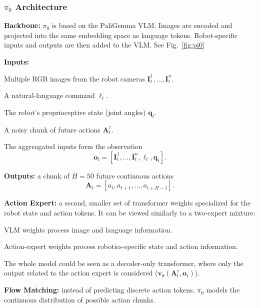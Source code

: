 \subsubsection{\texorpdfstring{$\pi_0$}{pi\_0} Architecture}

\begin{dashlist}

\item \textbf{Backbone:} $\pi_0$ is based on the PaliGemma VLM. Images are encoded and projected into the same embedding space as language tokens. Robot-specific inputs and outputs are then added to the VLM. See Fig.~\ref{fig:pi0}

\item \textbf{Inputs:}
\begin{dashlist}
    \item Multiple RGB images from the robot cameras $\mathbf{I}_t^1, \dots, \mathbf{I}_t^n$.
    \item A natural-language command $\ell_t$.
    \item The robot's proprioceptive state (joint angles) $\mathbf{q}_t$.
    \item A noisy chunk of future actions $\mathbf{A}_t^\tau$.
\end{dashlist}
The aggreagated inputs form the observation
\[
\mathbf{o}_t = [\mathbf{I}_t^1, \dots, \mathbf{I}_t^n, \ell_t, \mathbf{q}_t].
\]


\item \textbf{Outputs:} a chunk of $H=50$ future continuous actions
\[
    \mathbf{A}_t = [a_t,a_{t+1},\ldots,a_{t+H-1}].
\]

\item \textbf{Action Expert:} a second, smaller set of transformer weights specialized for the robot state and action tokens. It can be viewed similarly to a two-expert mixture:
\begin{dashlist}
    \item VLM weights process image and language information.
    \item Action-expert weights process robotics-specific state and action information.
\end{dashlist}
The whole model could be seen as a decoder-only transformer, where only the output related to the action expert is considered ($\mathbf{v}_\theta(\mathbf{A}_t^\tau,\mathbf{o}_t)$).

\item \textbf{Flow Matching:} instead of predicting discrete action tokens, $\pi_0$ models the continuous distribution of possible action chunks.


\end{dashlist}
